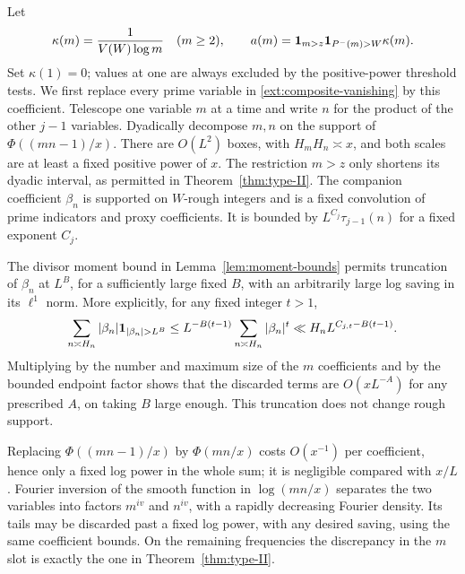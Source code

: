 Let
\begin{equation}\label{ext:proxy-weight}
 \kappa(m)=\frac1{V(W)\log m}\quad(m\geq2),\qquad
 a(m)=\mathbf{1}_{m>z}\mathbf{1}_{P^-(m)>W}\kappa(m).
\end{equation}
Set $\kappa(1)=0$; values at one are always excluded by the
positive-power threshold tests.
We first replace every prime variable in
\eqref{ext:composite-vanishing} by this coefficient.  Telescope
one variable $m$ at a time and write $n$ for the product of the
other $j-1$ variables.  Dyadically decompose $m,n$ on the support
of $\Phi((mn-1)/x)$.  There are $O(L^2)$ boxes, with
$H_mH_n\asymp x$, and both scales are at least a fixed positive
power of $x$.  The restriction $m>z$ only shortens its dyadic
interval, as permitted in Theorem~\ref{thm:type-II}.
The companion coefficient $\beta_n$ is supported on $W$-rough
integers and is a fixed convolution of prime indicators and proxy
coefficients.  It is bounded by $L^{C_j}\tau_{j-1}(n)$ for a
fixed exponent $C_j$.

The divisor moment bound in Lemma~\ref{lem:moment-bounds} permits
truncation of $\beta_n$ at $L^B$, for a sufficiently large fixed
$B$, with an arbitrarily large log saving in its $\ell^1$ norm.
More explicitly, for any fixed integer $t>1$,
\[
 \sum_{n\asymp H_n}|\beta_n|\1_{|\beta_n|>L^B}
 \leq L^{-B(t-1)}\sum_{n\asymp H_n}|\beta_n|^t
 \ll H_nL^{C_{j,t}-B(t-1)}.
\]
Multiplying by the number and maximum size of the $m$ coefficients
and by the bounded endpoint factor shows that the discarded
terms are $O(xL^{-A})$ for any prescribed $A$, on taking $B$
large enough.  This truncation does not change rough support.

Replacing $\Phi((mn-1)/x)$ by $\Phi(mn/x)$ costs
$O(x^{-1})$ per coefficient, hence only a fixed log power in the
whole sum; it is negligible compared with $x/L$.  Fourier inversion
of the smooth function in $\log(mn/x)$ separates the two variables
into factors $m^{iv}$ and $n^{iv}$, with a rapidly decreasing
Fourier density.  Its tails may be discarded past a fixed log
power, with any desired saving, using the same coefficient bounds.
On the remaining frequencies the discrepancy in the $m$ slot is
exactly the one in Theorem~\ref{thm:type-II}.

